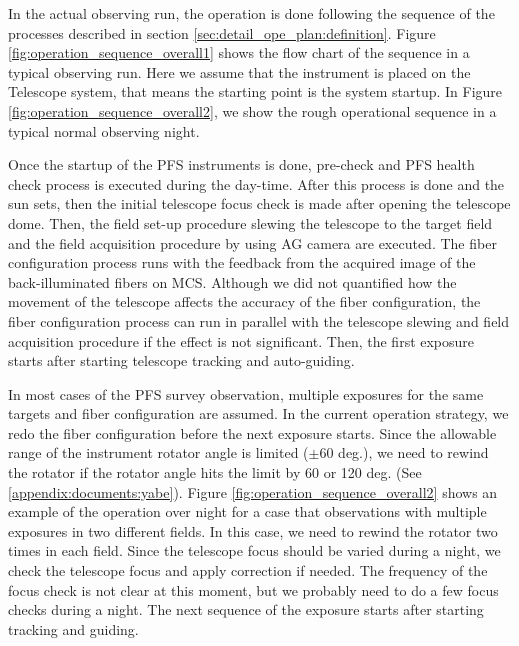 \documentclass[a4paper]{article}
\begin{document}
In the actual observing run, the operation is done following the sequence of the processes described in section \ref{sec:detail_ope_plan:definition}. Figure \ref{fig:operation_sequence_overall1} shows the flow chart of the sequence in a typical observing run. Here we assume that the instrument is placed on the Telescope system, that means the starting point is the system startup. In Figure \ref{fig:operation_sequence_overall2}, we show the rough operational sequence in a typical normal observing night. 

Once the startup of the PFS instruments is done, pre-check and PFS health check process is executed during the day-time. After this process is done and the sun sets, then the initial telescope focus check is made after opening the telescope dome. Then, the field set-up procedure slewing the telescope to the target field and the field acquisition procedure by using AG camera are executed. The fiber configuration process runs with the feedback from the acquired image of the back-illuminated fibers on MCS. Although we did not quantified how the movement of the telescope affects the accuracy of the fiber configuration, the fiber configuration process can run in parallel with the telescope slewing and field acquisition procedure if the effect is not significant. Then, the first exposure starts after starting telescope tracking and auto-guiding. 

In most cases of the PFS survey observation, multiple exposures for the same targets and fiber configuration are assumed. In the current operation strategy, we redo the fiber configuration before the next exposure starts. Since the allowable range of the instrument rotator angle is limited ($\pm 60$ deg.), we need to rewind the rotator if the rotator angle hits the limit by 60 or 120 deg. (See \ref{appendix:documents:yabe}). Figure \ref{fig:operation_sequence_overall2} shows an example of the operation over night for a case that observations with multiple exposures in two different fields. In this case, we need to rewind the rotator two times in each field. Since the telescope focus should be varied during a night, we check the telescope focus and apply correction if needed. The frequency of the focus check is not clear at this moment, but we probably need to do a few focus checks during a night. The next sequence of the exposure starts after starting tracking and guiding.
\end{document}
